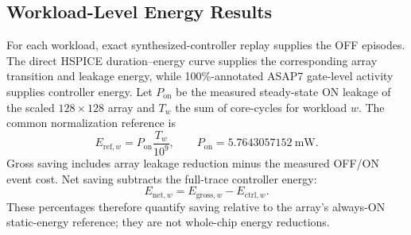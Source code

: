 \subsection{Workload-Level Energy Results}
\label{sec:workload-energy-results}

For each workload, exact synthesized-controller replay supplies the OFF
episodes.  The direct HSPICE duration--energy curve supplies the corresponding
array transition and leakage energy, while 100\%-annotated ASAP7 gate-level
activity supplies controller energy.  Let $P_{\mathrm{on}}$ be the measured
steady-state ON leakage of the scaled $128\times128$ array and $T_w$ the sum of
core-cycles for workload $w$.  The common normalization reference is
\begin{equation}
  E_{\mathrm{ref},w}=P_{\mathrm{on}}\frac{T_w}{10^9},
  \qquad P_{\mathrm{on}}=5.7643057152\ \mathrm{mW}.
\end{equation}
Gross saving includes array leakage reduction minus the measured OFF/ON event
cost.  Net saving subtracts the full-trace controller energy:
\begin{equation}
  E_{\mathrm{net},w}=E_{\mathrm{gross},w}-E_{\mathrm{ctrl},w}.
\end{equation}
These percentages therefore quantify saving relative to the array's
always-ON static-energy reference; they are not whole-chip energy reductions.

